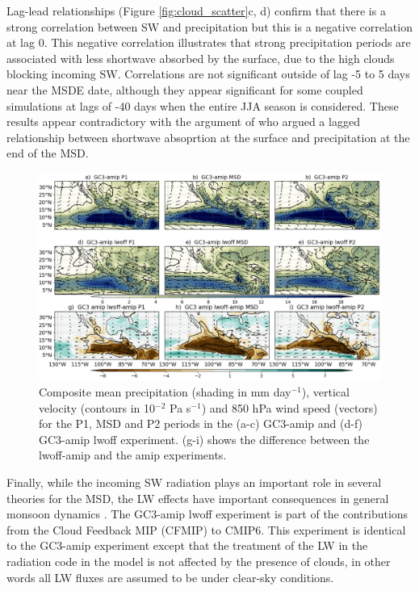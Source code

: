 Lag-lead relationships (Figure \ref{fig:cloud_scatter}c, d) confirm that there is a strong correlation between SW and precipitation but this is a negative correlation at lag 0. This negative correlation illustrates that strong precipitation periods are associated with less shortwave absorbed by the surface, due to the high clouds blocking incoming SW. Correlations are not significant outside of lag -5 to 5 days near the MSDE date, although they appear significant for some coupled simulations at lags of -40 days when the entire JJA season is considered. These results appear contradictory with the argument of \cite{karnauskas2013} who argued a lagged relationship between shortwave absoprtion at the surface and precipitation at the end of the MSD. 


 
\begin{figure}[t!]
\includegraphics[width=\linewidth]{figures/lwfig_clim_1.png}
\caption[Composite moisture flux and wind speed]{Composite mean precipitation (shading in mm day$^{-1}$), vertical velocity (contours in 10$^{-2}$ Pa s$^{-1}$) and 850 hPa wind speed (vectors) for the P1, MSD and P2 periods in the (a-c) GC3-amip and (d-f) GC3-amip lwoff experiment. (g-i) shows the difference between the lwoff-amip and the amip experiments.}
\label{fig:lwoff}
\end{figure}

Finally, while the incoming SW radiation plays an important role in several theories for the MSD, the LW effects have important consequences in general monsoon dynamics \citep{guo2015,byrne2020}. 
The GC3-amip lwoff experiment is part of the contributions from the Cloud Feedback MIP (CFMIP)  \citep{webb2017} to CMIP6. This experiment is identical to the GC3-amip experiment except that the treatment of the LW in the radiation code in the model is not affected by the presence of clouds, in other words all LW fluxes are assumed to be under clear-sky conditions. 

